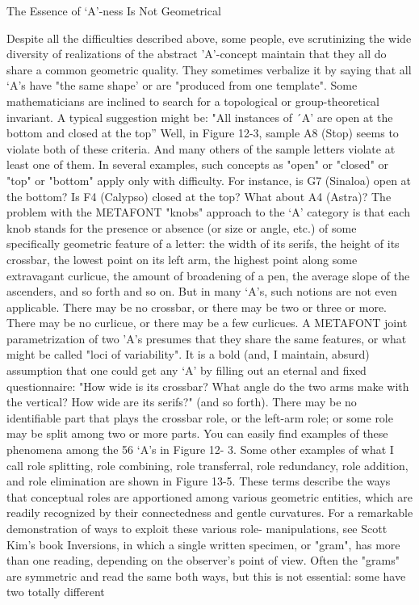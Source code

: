                         The Essence of `A'-ness Is Not Geometrical

        Despite all the difficulties described above, some people, eve scrutinizing the
wide diversity of realizations of the abstract 'A'-concept maintain that they all do share a
common geometric quality. They sometimes verbalize it by saying that all `A's have "the
same shape' or are "produced from one template". Some mathematicians are inclined to
search for a topological or group-theoretical invariant. A typical suggestion might be:
"All instances of ´A' are open at the bottom and closed at the top” Well, in Figure 12-3,
sample A8 (Stop) seems to violate both of these criteria. And many others of the sample
letters violate at least one of them. In several examples, such concepts as "open" or
"closed" or "top" or "bottom" apply only with difficulty. For instance, is G7 (Sinaloa)
open at the bottom? Is F4 (Calypso) closed at the top? What about A4 (Astra)?
        The problem with the METAFONT "knobs" approach to the `A' category is that
each knob stands for the presence or absence (or size or angle, etc.) of some specifically
geometric feature of a letter: the width of its serifs, the height of its crossbar, the lowest
point on its left arm, the highest point along some extravagant curlicue, the amount of
broadening of a pen, the average slope of the ascenders, and so forth and so on. But in
many `A's, such notions are not even applicable. There may be no crossbar, or there may
be two or three or more. There may be no curlicue, or there may be a few curlicues.
        A METAFONT joint parametrization of two 'A's presumes that they share the
same features, or what might be called "loci of variability". It is a bold (and, I maintain,
absurd) assumption that one could get any `A' by filling out an eternal and fixed
questionnaire: "How wide is its crossbar? What angle do the two arms make with the
vertical? How wide are its serifs?" (and so forth). There may be no identifiable part that
plays the crossbar role, or the left-arm role; or some role may be split among two or more
parts. You can easily find examples of these phenomena among the 56 `A's in Figure 12-
3. Some other examples of what I call role splitting, role combining, role transferral, role
redundancy, role addition, and role elimination are shown in Figure 13-5. These terms
describe the ways that conceptual roles are apportioned among various geometric entities,
which are readily recognized by their connectedness and gentle curvatures.
        For a remarkable demonstration of ways to exploit these various role-
manipulations, see Scott Kim's book Inversions, in which a single written specimen, or
"gram", has more than one reading, depending on the observer's point of view. Often the
"grams" are symmetric and read the same both ways, but this is not essential: some have
two totally different




